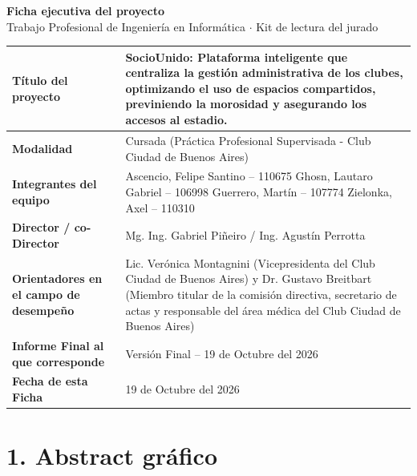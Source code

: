 \documentclass{estilo}
\begin{document}

\begin{center}
    \LARGE \textbf{Ficha ejecutiva del proyecto} \\
    \vspace{0.2cm}
    \large Trabajo Profesional de Ingeniería en Informática $\cdot$ Kit de lectura del jurado
\end{center}
\vspace{0.3cm}

\noindent
\renewcommand{\arraystretch}{1.5}
\begin{tabularx}{\textwidth}{|>{\columncolor[gray]{0.95}\bfseries}p{4.5cm}|X|}
\hline
Título del proyecto & SocioUnido: Plataforma inteligente que centraliza la gestión administrativa de los clubes, optimizando el uso de espacios compartidos, previniendo la morosidad y asegurando los accesos al estadio. \\
\hline
Modalidad & Cursada (Práctica Profesional Supervisada - Club Ciudad de Buenos Aires) \\
\hline
Integrantes del equipo & 
Ascencio, Felipe Santino -- 110675 \newline
Ghosn, Lautaro Gabriel -- 106998 \newline
Guerrero, Martín -- 107774 \newline
Zielonka, Axel -- 110310 \\
\hline
Director / co-Director & Mg. Ing. Gabriel Piñeiro / Ing. Agustín Perrotta \\
\hline
Orientadores en el campo de desempeño & Lic. Verónica Montagnini (Vicepresidenta del Club Ciudad de Buenos Aires) y Dr. Gustavo Breitbart (Miembro titular de la comisión directiva, secretario de actas y responsable del área médica del Club Ciudad de Buenos Aires) \\
\hline
Informe Final al que corresponde & Versión Final -- 19 de Octubre del 2026 \\
\hline
Fecha de esta Ficha & 19 de Octubre del 2026 \\
\hline
\end{tabularx}

\vspace{0.3cm}

\section*{1. Abstract gráfico}
\end{document}
